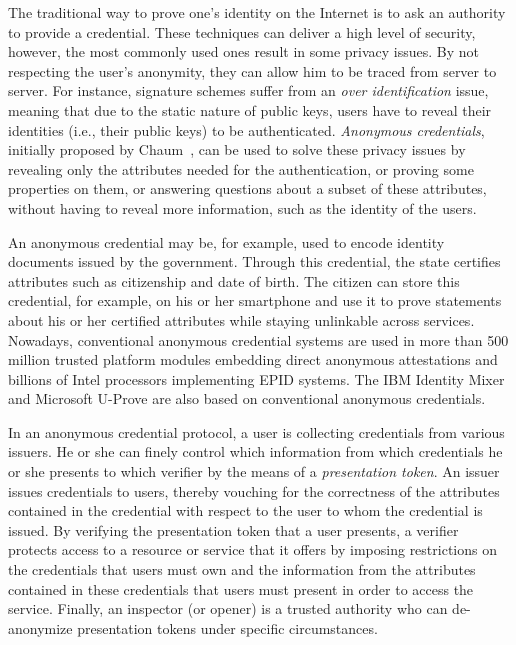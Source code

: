  The traditional way to 
prove one's identity on the Internet is to ask an authority to provide a 
credential. These techniques can deliver a high level of security, 
however, the most commonly used ones result in some privacy issues. By not 
respecting the user's anonymity, they can allow him to be traced from server 
to server. For instance, signature schemes suffer from an \emph{over 
identification} issue, meaning that due to the static nature of public 
keys, users have to reveal their identities (i.e., their public keys) to 
be authenticated. \emph{Anonymous credentials}, initially proposed by 
Chaum~\cite{DBLP:journals/cacm/Chaum85}, can be used to solve these 
privacy issues by revealing only the attributes needed for the 
authentication, or proving some properties on them, or answering 
questions about a subset of these attributes, without having to 
reveal more information, such as the identity of the users.


An anonymous credential may be, for example, used to encode identity 
documents issued by the government. Through this credential, the state 
certifies attributes such as citizenship and date of birth. The citizen 
can store this credential, for example, on his or her smartphone and use 
it to prove statements about his or her certified attributes while 
staying unlinkable across services. Nowadays, conventional anonymous 
credential systems are used in more than 500 million trusted platform 
modules embedding direct anonymous attestations and billions of Intel 
processors implementing EPID systems. The IBM Identity Mixer and 
Microsoft U-Prove are also based on conventional anonymous credentials.

In an anonymous credential protocol, a user is collecting credentials 
from various issuers. He or she can finely control which information 
from which credentials he or she presents to which verifier by the means 
of a \emph{presentation token}. 
	An issuer issues credentials to users, thereby vouching for the 
correctness of the attributes contained in the credential with respect 
to the user to whom the credential is issued.
	By verifying the presentation token that a user presents, a 
verifier protects access to a resource or service that it offers by 
imposing restrictions on the credentials that users must own and the 
information from the attributes contained in these credentials that 
users must present in order to access the service. Finally, an inspector 
(or opener) is a trusted authority who can de-anonymize presentation 
tokens under specific circumstances.

